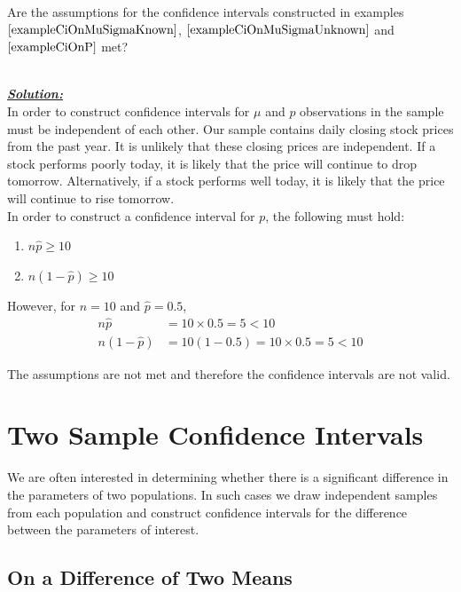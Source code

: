 \begin{example}
Are the assumptions for the confidence intervals constructed in 
examples $\ref{exampleCiOnMuSigmaKnown}$, $\ref{exampleCiOnMuSigmaUnknown}$  and $\ref{exampleCiOnP}$ met?

\hfill\\
{\emph{\textbf{\underline{Solution:}}}}\\

In order to construct confidence intervals for $\mu$ and $p$ observations in the sample must be independent of each other. Our sample contains daily closing stock prices from the past year. It is unlikely that these closing prices are independent. If a stock performs poorly today, it is likely that the price will continue to drop tomorrow. Alternatively, if a stock performs well today, it is likely that the price will continue to rise tomorrow. \\

In order to construct a confidence interval for $p$, the following must hold:
\begin{enumerate}[1.]
\item $n\hat{p} \geq 10$
\item $n(1-\hat{p}) \geq 10$
\end{enumerate} 

However, for $n=10$ and $\hat{p}=0.5$,
\begin{align*}
n \hat{p} &= 10 \times 0.5 = 5 < 10 \\
n(1-\hat{p}) &= 10(1-0.5) = 10 \times 0.5 = 5 < 10 
\end{align*}

The assumptions are not met and therefore the confidence intervals are not valid.

\end{example}


\section{Two Sample Confidence Intervals}

We are often interested in determining whether there is a significant difference in the parameters of two populations. In such cases we draw independent samples from each population and construct confidence intervals for the difference between the parameters of interest.

\subsection{On a Difference of Two Means}

